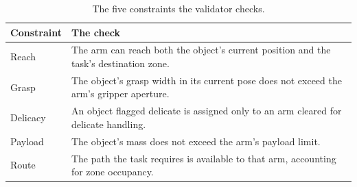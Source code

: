 \begin{table}[H]
\centering
\caption{The five constraints the validator checks.}
\label{tab:system:constraints}
\begin{tabular}{ll}
\toprule
Constraint & The check \\
\midrule
Reach & The arm can reach both the object's current position and the task's destination zone. \\
Grasp & The object's grasp width in its current pose does not exceed the arm's gripper aperture. \\
Delicacy & An object flagged delicate is assigned only to an arm cleared for delicate handling. \\
Payload & The object's mass does not exceed the arm's payload limit. \\
Route & The path the task requires is available to that arm, accounting for zone occupancy. \\
\bottomrule
\end{tabular}
\end{table}
